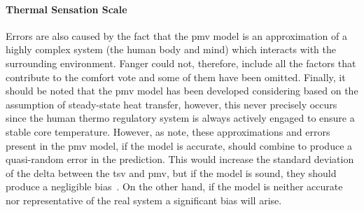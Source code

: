 \paragraph{Thermal Sensation Scale}
Errors are also caused by the fact that the \ac{pmv} model is an approximation of a highly complex system (the human body and mind) which interacts with the surrounding environment.
Fanger could not, therefore, include all the factors that contribute to the comfort vote and some of them have been omitted.
Finally, it should be noted that the \ac{pmv} model has been developed considering based on the assumption of steady-state heat transfer, however, this never precisely occurs since the human thermo regulatory system is always actively engaged to ensure a stable core temperature.
However, as  note, these approximations and errors present in the \ac{pmv} model, if the model is accurate, should combine to produce a quasi-random error in the prediction.
This would increase the standard deviation of the delta between the \ac{tsv} and \ac{pmv}, but if the model is sound, they should produce a negligible bias~\cite{Humphreys2002}.
On the other hand, if the model is neither accurate nor representative of the real system a significant bias will arise.